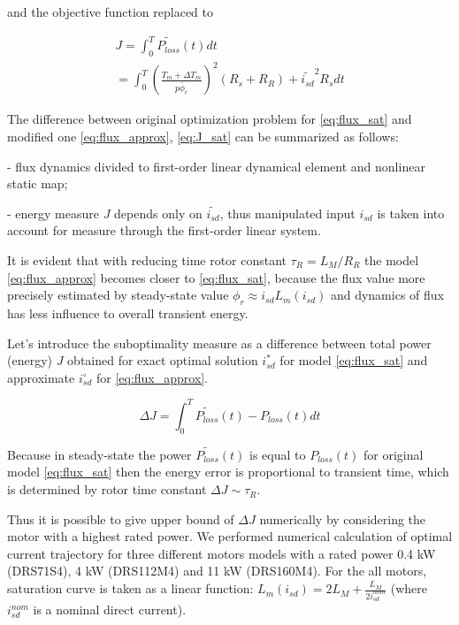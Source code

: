 \documentclass[journal]{IEEEtran}
\begin{document}
and the objective function replaced to 

\begin{equation}\label{eq:J_sat}
\begin{gathered}
J = \int_0^T \widetilde{P_{loss}}(t) dt \\
= \int_0^T \left ( \frac{T_m+\Delta T_m}{p \widetilde{\phi_r}} \right )^2 (R_s + R_R) + \widetilde{i_{sd}}^2 R_s dt
\end{gathered}
\end{equation}

The difference between original optimization problem for \eqref{eq:flux_sat} and modified one \eqref{eq:flux_approx}, \eqref{eq:J_sat} can be summarized as follows:

- flux dynamics divided to first-order linear dynamical element and nonlinear static map;

- energy measure $J$ depends only on $\widetilde{i_{sd}}$, thus manipulated input $i_{sd}$ is taken into account for measure through the first-order linear system.

It is evident that with reducing time rotor constant $\tau_R = L_M/R_R$ the model \eqref{eq:flux_approx} becomes closer to \eqref{eq:flux_sat}, because the flux value more precisely estimated by steady-state value $\phi_r \approx i_{sd} L_m(i_{sd})$ and dynamics of flux has less influence to overall transient energy. 

Let's introduce the suboptimality measure as a difference between total power (energy) $J$ obtained for exact optimal solution $i_{sd}^*$ for model \eqref{eq:flux_sat} and approximate $i_{sd}^\circ$ for \eqref{eq:flux_approx}. 

\begin{equation}\label{eq:delta_J}
\Delta J = \int_0^T \widetilde{P_{loss}}(t) - P_{loss}(t) dt
\end{equation}

Because in steady-state the power $\widetilde{P_{loss}}(t)$ is equal to $P_{loss}(t)$ for original model \eqref{eq:flux_sat} then the energy error is proportional to transient time, which is determined by rotor time constant $\Delta J \sim \tau_R$.

Thus it is possible to give upper bound of $\Delta J$ numerically by considering the motor with a highest rated power. We performed numerical calculation of optimal current trajectory for three different motors models with a rated power 0.4 kW (DRS71S4), 4 kW (DRS112M4) and 11 kW (DRS160M4). 
For the all motors, saturation curve is taken as a linear function: $L_m(i_{sd}) = 2 L_M + \frac{L_M}{2 i_{sd}^{nom}}$ (where $i_{sd}^{nom}$ is a nominal direct current).
\end{document}
